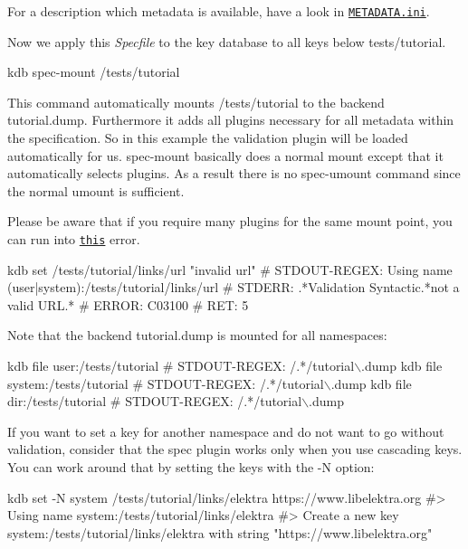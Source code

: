 For a description which metadata is available, have a look in \href{/home/jenkins/workspace/libelektra-release/doc/METADATA.ini}{\tt M\+E\+T\+A\+D\+A\+T\+A.\+ini}.

Now we apply this {\itshape Specfile} to the key database to all keys below {\ttfamily tests/tutorial}.


\begin{DoxyCode}
kdb spec-mount /tests/tutorial
\end{DoxyCode}


This command automatically mounts {\ttfamily /tests/tutorial} to the backend {\ttfamily tutorial.\+dump}. Furthermore it adds all plugins necessary for all metadata within the specification. So in this example the validation plugin will be loaded automatically for us. {\ttfamily spec-\/mount} basically does a normal mount except that it automatically selects plugins. As a result there is no {\ttfamily spec-\/umount} command since the normal {\ttfamily umount} is sufficient.

Please be aware that if you require many plugins for the same mount point, you can run into \href{https://github.com/ElektraInitiative/libelektra/issues/2133}{\tt this} error.


\begin{DoxyCode}
kdb set /tests/tutorial/links/url "invalid url"
# STDOUT-REGEX: Using name (user|system):/tests/tutorial/links/url
# STDERR: .*Validation Syntactic.*not a valid URL.*
# ERROR:  C03100
# RET:    5
\end{DoxyCode}


Note that the backend {\ttfamily tutorial.\+dump} is mounted for all namespaces\+:


\begin{DoxyCode}
kdb file user:/tests/tutorial
# STDOUT-REGEX: /.*/tutorial\(\backslash\).dump
kdb file system:/tests/tutorial
# STDOUT-REGEX: /.*/tutorial\(\backslash\).dump
kdb file dir:/tests/tutorial
# STDOUT-REGEX: /.*/tutorial\(\backslash\).dump
\end{DoxyCode}


If you want to set a key for another namespace and do not want to go without validation, consider that the spec plugin works only when you use cascading keys. You can work around that by setting the keys with the {\ttfamily -\/N} option\+:


\begin{DoxyCode}
kdb set -N system /tests/tutorial/links/elektra https://www.libelektra.org
#> Using name system:/tests/tutorial/links/elektra
#> Create a new key system:/tests/tutorial/links/elektra with string "https://www.libelektra.org"
\end{DoxyCode}


